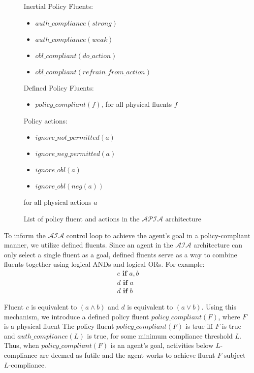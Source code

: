 \begin{figure}[p]
    \begin{framed}
        Inertial Policy Fluents:
        \begin{itemize}
            \item $auth\_compliance(strong)$
            \item $auth\_compliance(weak)$
            \item $obl\_compliant(do\_action)$
            \item $obl\_compliant(refrain\_from\_action)$
        \end{itemize}

        Defined Policy Fluents:
        \begin{itemize}
            \item $policy\_compliant(f)$, for all physical fluents $f$
        \end{itemize}

        Policy actions:
        \begin{itemize}
            \item $ignore\_not\_permitted(a)$
            \item $ignore\_neg\_permitted(a)$
            \item $ignore\_obl(a)$
            \item $ignore\_obl(neg(a))$
        \end{itemize}
        for all physical actions $a$
    \end{framed}
    \caption{List of policy fluent and actions in the $\mathcal{APIA}$ architecture}
    \label{fig:apia_list_policy_fluents_actions}
\end{figure}

To inform the $\mathcal{AIA}$ control loop to achieve the agent's goal in a policy-compliant manner, we utilize defined fluents.
Since an agent in the $\mathcal{AIA}$ architecture can only select a single fluent as a goal, defined fluents serve as a way to combine fluents together using logical ANDs and logical ORs.
For example:
\begin{gather}
    c \textbf{ if } a, b \\
    d \textbf{ if } a \\
    d \textbf{ if } b
\end{gather}

Fluent $c$ is equivalent to $(a \land b)$ and $d$ is equivalent to $(a \lor b)$.
Using this mechanism, we introduce a defined policy fluent $policy\_compliant(F)$, where $F$ is a physical fluent
The policy fluent $policy\_compliant(F)$ is true iff $F$ is true and $auth\_compliance(L)$ is true, for some minimum compliance threshold $L$.
Thus, when $policy\_compliant(F)$ is an agent's goal, activities below $L$-compliance are deemed as futile and the agent works to achieve fluent $F$ subject $L$-compliance.

